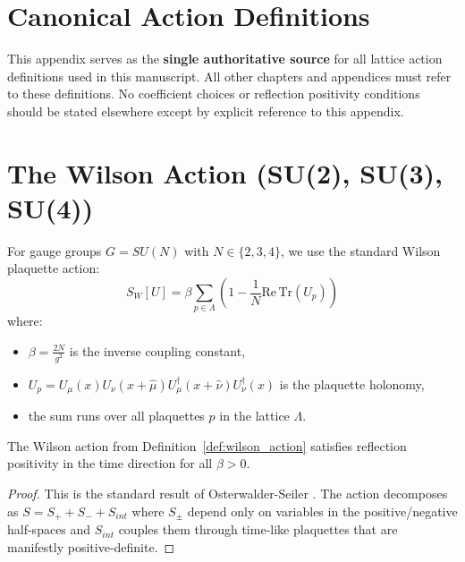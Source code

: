 \section{Canonical Action Definitions}
\label{ch:action_definitions}

\begin{remark}
This appendix serves as the \textbf{single authoritative source} for all lattice action definitions used in this manuscript. All other chapters and appendices must refer to these definitions. No coefficient choices or reflection positivity conditions should be stated elsewhere except by explicit reference to this appendix.
\end{remark}

\section{The Wilson Action (SU(2), SU(3), SU(4))}
\label{sec:wilson_action_canonical}

\begin{definition}
\label{def:wilson_action}
For gauge groups $G = SU(N)$ with $N \in \{2, 3, 4\}$, we use the standard Wilson plaquette action:
\begin{equation}
S_W[U] = \beta \sum_{p \in \Lambda} \left(1 - \frac{1}{N}\mathrm{Re}\,\mathrm{Tr}(U_p)\right)
\end{equation}
where:
\begin{itemize}
    \item $\beta = \frac{2N}{g^2}$ is the inverse coupling constant,
    \item $U_p = U_\mu(x) U_\nu(x+\hat{\mu}) U_\mu^\dagger(x+\hat{\nu}) U_\nu^\dagger(x)$ is the plaquette holonomy,
    \item the sum runs over all plaquettes $p$ in the lattice $\Lambda$.
\end{itemize}
\end{definition}

\begin{proposition}
\label{prop:wilson_rp}
The Wilson action from Definition~\ref{def:wilson_action} satisfies reflection positivity in the time direction for all $\beta > 0$.
\end{proposition}
\begin{proof}
This is the standard result of Osterwalder-Seiler \cite{OsterwalderSeiler1978}. The action decomposes as $S = S_+ + S_- + S_{int}$ where $S_\pm$ depend only on variables in the positive/negative half-spaces and $S_{int}$ couples them through time-like plaquettes that are manifestly positive-definite.
\end{proof}

